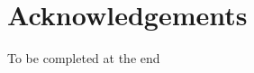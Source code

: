 \documentclass[ %
                    author={James Stephenson},
                supervisor={Dr. Edwin Simpson},
                    degree={MSc},
                     title={Bayesian Deep Learning For Extractive Test Summarisation},
                  subtitle={},
                      type={},
                      year={2023}]{../additions/dissertation}
\begin{document}
		
	
	\chapter*{Acknowledgements}
	
		To be completed at the end
		
\end{document}
